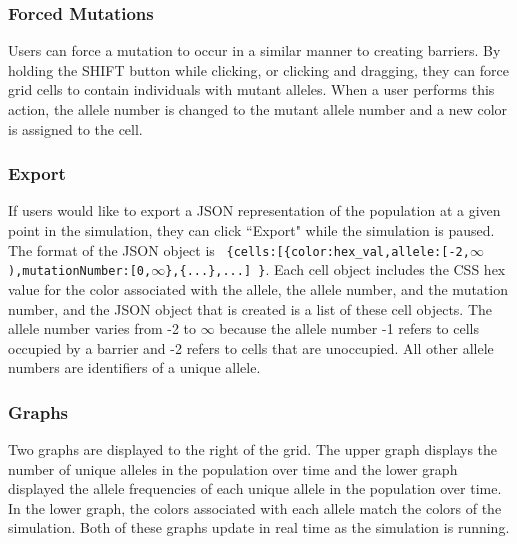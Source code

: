 \documentclass[12pt]{article}
\begin{document}
\begin{spacing}{1.5}
\subsubsection{Forced Mutations}
Users can force a mutation to occur in a similar manner to creating barriers. By holding the SHIFT button while clicking, or clicking and dragging, they can force grid cells to contain individuals with mutant alleles. When a user performs this action, the allele number is changed to the mutant allele number and a new color is assigned to the cell.

\subsubsection{Export}
If users would like to export a JSON representation of the population at a given point in the simulation, they can click ``Export" while the simulation is paused. The format of the JSON object is \ \texttt{\{cells:[\{color:hex\_val,allele:[-2,$\infty$),mutationNumber:[0,$\infty$\},\{...\},...] \}}. Each cell object includes the CSS hex value for the color associated with the allele, the allele number, and the mutation number, and the JSON object that is created is a list of these cell objects. The allele number varies from -2 to $\infty$ because the allele number -1 refers to cells occupied by a barrier and -2 refers to cells that are unoccupied. All other allele numbers are identifiers of a unique allele.

\subsubsection{Graphs}
Two graphs are displayed to the right of the grid. The upper graph displays the number of unique alleles in the population over time and the lower graph displayed the allele frequencies of each unique allele in the population over time. In the lower graph, the colors associated with each allele match the colors of the simulation. Both of these graphs update in real time as the simulation is running.


\end{spacing}
\end{document}
